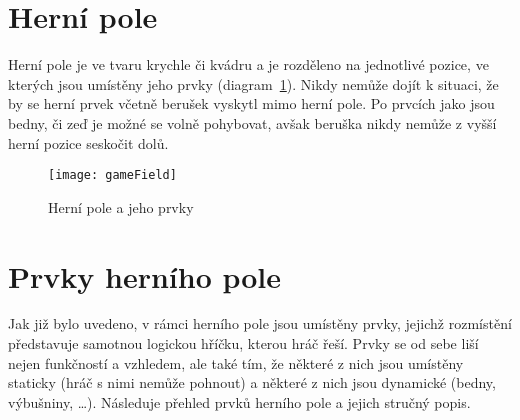 \section{Herní pole}
Herní pole je ve tvaru krychle či kvádru a je rozděleno na jednotlivé pozice, ve kterých jsou umístěny jeho prvky (diagram~\ref{fig:gameField}). Nikdy nemůže dojít k situaci, že by se herní prvek včetně berušek vyskytl mimo herní pole. Po prvcích jako jsou bedny, či zeď je možné se volně pohybovat, avšak beruška nikdy nemůže z vyšší herní pozice seskočit dolů.

\begin{figure}[htb]
\centering
\texttt{[image: gameField]}
\caption{Herní pole a jeho prvky}
\label{fig:gameField}
\end{figure}

\section{Prvky herního pole}
Jak již bylo uvedeno, v rámci herního pole jsou umístěny prvky, jejichž rozmístění představuje samotnou logickou hříčku, kterou hráč řeší. Prvky se od sebe liší nejen funkčností a vzhledem, ale také tím, že některé z nich jsou umístěny staticky (hráč s nimi nemůže pohnout) a některé z nich jsou dynamické (bedny, výbušniny, \ldots). Následuje přehled prvků herního pole a jejich stručný popis.

